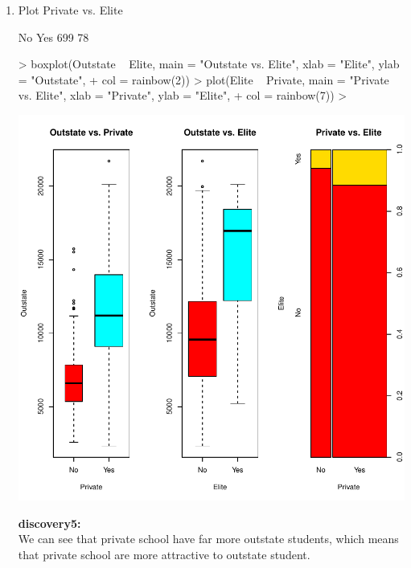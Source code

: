 \documentclass[a4paper]{article}
\begin{document}
\begin{enumerate}
\item Plot Private vs. Elite

\begin{Schunk}
\begin{Soutput}
 No Yes 
699  78 
\end{Soutput}
\begin{Sinput}
> boxplot(Outstate ~ Elite, main = "Outstate vs. Elite", xlab = "Elite", ylab = "Outstate",
+         col = rainbow(2))
> plot(Elite ~ Private, main = "Private vs. Elite", xlab = "Private", ylab = "Elite",
+      col = rainbow(7))
> 
\end{Sinput}
\end{Schunk}
\includegraphics{introduction-outstate-private}

{
\colorbox{BurntOrange}{\textbf{discovery5:}}\color{red}\\
We can see that private school have far more outstate students, which means that private school are more attractive to outstate student.
}



\end{enumerate}
\end{document}

